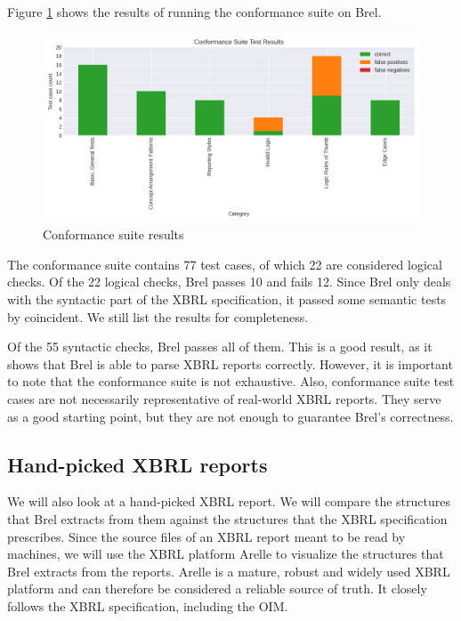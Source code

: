 Figure \ref{fig:conformance_suite} shows the results of running the conformance suite on Brel.

\begin{figure}[H]
  \centering
  \includegraphics[width=1\textwidth]{images/seattle_method_test_results.png}
    \caption{Conformance suite results}
    \label{fig:conformance_suite}
\end{figure}

The conformance suite contains 77 test cases, of which 22 are considered logical checks.
Of the 22 logical checks, Brel passes 10 and fails 12.
Since Brel only deals with the syntactic part of the XBRL specification,
it passed some semantic tests by coincident.
We still list the results for completeness.

Of the 55 syntactic checks, Brel passes all of them.
This is a good result, as it shows that Brel is able to parse XBRL reports correctly.
However, it is important to note that the conformance suite is not exhaustive.
Also, conformance suite test cases are not necessarily representative of real-world XBRL reports.
They serve as a good starting point, but they are not enough to guarantee Brel's correctness.

\subsection{Hand-picked XBRL reports}

We will also look at a hand-picked XBRL report.
We will compare the structures that Brel extracts from them against the structures that the XBRL specification prescribes.
Since the source files of an XBRL report meant to be read by machines,
we will use the XBRL platform Arelle to visualize the structures that Brel extracts from the reports.
Arelle is a mature, robust and widely used XBRL platform and can therefore be considered a reliable source of truth.
It closely follows the XBRL specification, including the OIM.

